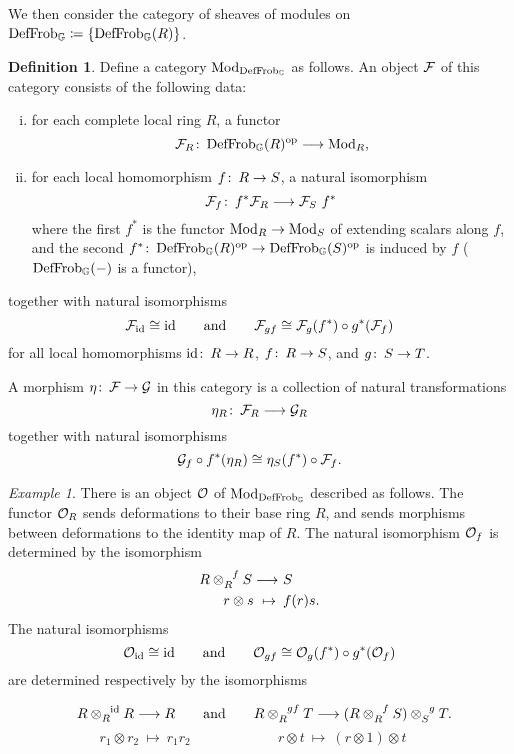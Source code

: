 \documentclass{gtpart}
\theoremstyle{definition}
\newtheorem{defn}[thm]{Definition}
\theoremstyle{remark}
\newtheorem{ex}[thm]{Example}
\def\co{\colon\thinspace}
\newcommand{\mb}[1]{\mathbb{#1}}
\newcommand{\CF}{{\cal F}}
\newcommand{\CG}{{\cal G}}
\newcommand{\CO}{{\cal O}}
\newcommand{\Mod}{{\rm Mod}}
\newcommand{\DF}{{{\rm DefFrob}_\BG}}
\newcommand{\BG}{{\mb G}}
\newcommand{\ad}{{\rm and}}
\newcommand{\id}{{\rm id}}
\newcommand{\op}{{\rm op}}
\newcommand{\ce}{\coloneqq}
\numberwithin{equation}{section}
\numberwithin{thm}{section}
\begin{document}
We then consider the category of sheaves of modules on 
$\DF \ce \{\DF(R)\}$.  

\begin{defn}
\label{def:mod}
 Define a category $\Mod_\DF$ as follows.  An object $\CF$ of this 
 category consists of the following data: 
 \begin{enumerate}[(i)]
  \item for each complete local ring $R$, a functor 
  \[
  \CF_R \co \DF(R)^\op \longrightarrow \Mod_R, 
  \]

  \item for each local homomorphism $f \co R \to S$, a natural 
  isomorphism 
  \[
  \CF_f \co f^*\CF_R \longrightarrow \CF_S ~f^* 
  \]
  where the first $f^*$ is the functor $\Mod_R \to \Mod_S$ of extending 
  scalars along $f$, and the second $f^* \co \DF(R)^\op \to \DF(S)^\op$ 
  is induced by $f$ ($\DF(-)$ is a functor), 
 \end{enumerate}
 together with natural isomorphisms 
 \[
  \CF_\id \cong \id \qquad \ad \qquad \CF_{gf} \cong 
  \CF_g(f^*) \circ g^*(\CF_f) 
 \]
 for all local homomorphisms $\id \co R \to R$, $f \co R \to S$, and 
 $g \co S \to T$.  

 A morphism $\eta \co \CF \to \CG$ in this category is a collection of 
 natural transformations 
 \[
  \eta_R \co \CF_R \longrightarrow \CG_R 
 \]
 together with natural isomorphisms 
 \[
  \CG_f \circ f^*(\eta_R) \cong \eta_S(f^*) \circ \CF_f.  
 \]
\end{defn}

\begin{ex}
 There is an object $\CO$ of $\Mod_\DF$ described as follows.  The 
 functor $\CO_R$ sends deformations to their base ring $R$, and sends 
 morphisms between deformations to the identity map of $R$.  The natural 
 isomorphism $\CO_f$ is determined by the isomorphism 
 \begin{equation*}
 \begin{split}
  R \tensor[]{\otimes}{_R^f} S \longrightarrow & ~ S \\
              r \otimes s ~ \mapsto \thinspace & ~ f(r) s.  
 \end{split}
 \end{equation*}
 The natural isomorphisms 
 \[
  \CO_\id \cong \id \qquad \ad \qquad \CO_{gf} \cong 
  \CO_g(f^*) \circ g^*(\CO_f) 
 \]
 are determined respectively by the isomorphisms 
 \begin{spacing}{.9}
  \[
   ~~ R \tensor[]{\otimes}{_R^\id} R \longrightarrow R \qquad \ad \qquad 
   R \tensor[]{\otimes}{_R^{gf}} T \longrightarrow 
   (R \tensor[]{\otimes}{_R^f} S) \tensor[]{\otimes}{_S^g} T.  
  \]
  \[
   \qquad r_1 \otimes r_2 ~ \mapsto ~ r_1 r_2 \qquad \qquad \qquad 
   ~ r \otimes t ~ \mapsto ~ (r \otimes 1) \otimes t \qquad \quad
  \]
 \end{spacing}
\end{ex}
\end{document}
